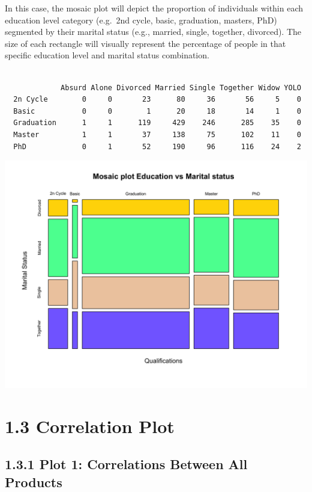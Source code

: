 \documentclass[
  a4paperpaper,
  DIV=11,
  numbers=noendperiod]{scrartcl}
\begin{document}
In this case, the mosaic plot will depict the proportion of individuals
within each education level category (e.g.~2nd cycle, basic, graduation,
masters, PhD) segmented by their marital status (e.g., married, single,
together, divorced). The size of each rectangle will visually represent
the percentage of people in that specific education level and marital
status combination.

\begin{verbatim}
            
             Absurd Alone Divorced Married Single Together Widow YOLO
  2n Cycle        0     0       23      80     36       56     5    0
  Basic           0     0        1      20     18       14     1    0
  Graduation      1     1      119     429    246      285    35    0
  Master          1     1       37     138     75      102    11    0
  PhD             0     1       52     190     96      116    24    2
\end{verbatim}

\includegraphics{Report_files/figure-pdf/unnamed-chunk-5-1.png}

\newpage

\hypertarget{correlation-plot}{%
\section{1.3 Correlation Plot}\label{correlation-plot}}

\hypertarget{plot-1-correlations-between-all-products}{%
\subsection{1.3.1 Plot 1: Correlations Between All
Products}\label{plot-1-correlations-between-all-products}}
\end{document}
